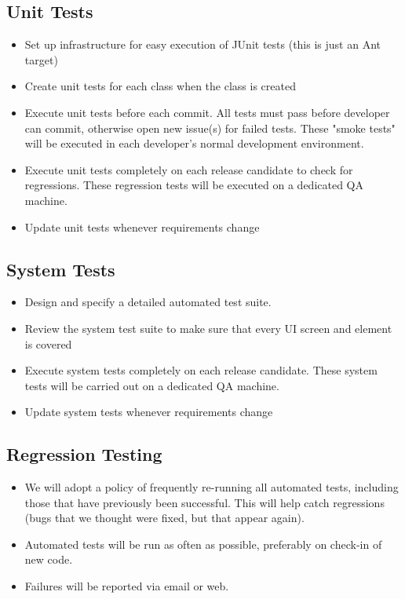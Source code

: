 \documentclass[11pt]{article}
\begin{document}
\subsection{Unit Tests}

\begin{itemize}
\item Set up infrastructure for easy execution of JUnit tests (this is just an Ant target)
\item Create unit tests for each class when the class is created
\item Execute unit tests before each commit. All tests must pass before developer can commit, otherwise open new issue(s) for failed tests. These "smoke tests" will be executed in each developer's normal development environment.
\item Execute unit tests completely on each release candidate to check for regressions. These regression tests will be executed on a dedicated QA machine.
\item Update unit tests whenever requirements change
\end{itemize}

\subsection{System Tests}

\begin{itemize}
\item Design and specify a detailed automated test suite.
\item Review the system test suite to make sure that every UI screen and element is covered
\item Execute system tests completely on each release candidate. These system tests will be carried out on a dedicated QA machine.
\item Update system tests whenever requirements change
\end{itemize}

\subsection{Regression Testing}

\begin{itemize}
\item We will adopt a policy of frequently re-running all automated tests, including those that have previously been successful. This will help catch regressions (bugs that we thought were fixed, but that appear again).
\item Automated tests will be run as often as possible, preferably on check-in of new code.
\item Failures will be reported via email or web.
\end{itemize}
\end{document}
